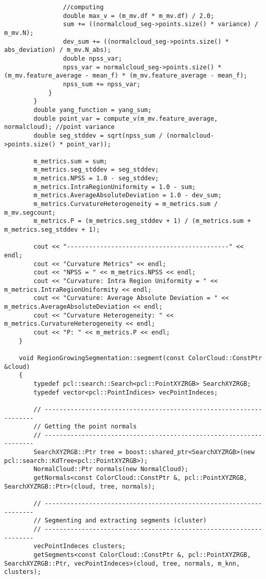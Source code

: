 \begin{lstlisting}
				//computing
				double max_v = (m_mv.df * m_mv.df) / 2.0;
				sum += ((normalcloud_seg->points.size() * variance) / m_mv.N);
				dev_sum += ((normalcloud_seg->points.size() * abs_deviation) / m_mv.N_abs);
				double npss_var;
				npss_var = normalcloud_seg->points.size() * (m_mv.feature_average - mean_f) * (m_mv.feature_average - mean_f);
				npss_sum += npss_var;
			}
		}
		double yang_function = yang_sum;
		double point_var = compute_v(m_mv.feature_average, normalcloud); //point variance
		double seg_stddev = sqrt(npss_sum / (normalcloud->points.size() * point_var));

		m_metrics.sum = sum;
		m_metrics.seg_stddev = seg_stddev;
		m_metrics.NPSS = 1.0 - seg_stddev;
		m_metrics.IntraRegionUniformity = 1.0 - sum;
		m_metrics.AverageAbsoluteDeviation = 1.0 - dev_sum;
		m_metrics.CurvatureHeterogeneity = m_metrics.sum / m_mv.segcount;
		m_metrics.P = (m_metrics.seg_stddev + 1) / (m_metrics.sum + m_metrics.seg_stddev + 1);

		cout << "--------------------------------------------" << endl;
		cout << "Curvature Metrics" << endl;
		cout << "NPSS = " << m_metrics.NPSS << endl;
		cout << "Curvature: Intra Region Uniformity = " << m_metrics.IntraRegionUniformity << endl;
		cout << "Curvature: Average Absolute Deviation = " << m_metrics.AverageAbsoluteDeviation << endl;
		cout << "Curvature Heterogeneity: " << m_metrics.CurvatureHeterogeneity << endl;
		cout << "P: " << m_metrics.P << endl;
	}

	void RegionGrowingSegmentation::segment(const ColorCloud::ConstPtr &cloud)
	{
		typedef pcl::search::Search<pcl::PointXYZRGB> SearchXYZRGB;
		typedef vector<pcl::PointIndices> vecPointIndeces;

		// -------------------------------------------------------------------
		// Getting the point normals
		// -------------------------------------------------------------------
		SearchXYZRGB::Ptr tree = boost::shared_ptr<SearchXYZRGB>(new pcl::search::KdTree<pcl::PointXYZRGB>);
		NormalCloud::Ptr normals(new NormalCloud);
		getNormals<const ColorCloud::ConstPtr &, pcl::PointXYZRGB, SearchXYZRGB::Ptr>(cloud, tree, normals);

		// -------------------------------------------------------------------
		// Segmenting and extracting segments (cluster)
		// -------------------------------------------------------------------
		vecPointIndeces clusters;
		getSegments<const ColorCloud::ConstPtr &, pcl::PointXYZRGB, SearchXYZRGB::Ptr, vecPointIndeces>(cloud, tree, normals, m_knn, clusters);


\end{lstlisting}
